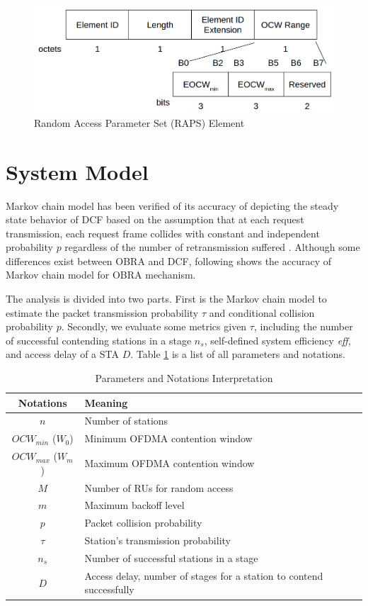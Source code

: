 \documentclass[journal]{IEEEtran}
\begin{document}
\begin{figure}[!t]
\includegraphics[scale=0.24]{./figure/Section_preliminary/fig_RAPS.png}
\caption{Random Access Parameter Set (RAPS) Element}
\label{fig_RAPS}
\end{figure}



\section{System Model} 		\label{sec_sys_model}
Markov chain model has been verified of its accuracy of depicting the steady state behavior of DCF based on the assumption that at each request transmission, each request frame collides with constant and independent probability $p$ regardless of the number of retransmission suffered \cite{bianchi2000performance}. 
Although some differences exist between OBRA and DCF, following shows the accuracy of Markov chain model for OBRA mechanism.

The analysis is divided into two parts. First is the Markov chain model to estimate the packet transmission probability $\tau$ and conditional collision probability $p$. 
Secondly, we evaluate some metrics given $\tau$, including the number of successful contending stations in a stage $n_s$, self-defined system efficiency \textit{eff}, and access delay of a STA $D$.  
Table \ref{table_notation} is a list of all parameters and notations.


\begin{table}[!h]
\caption{Parameters and Notations Interpretation}
\centering
\label{table_notation}
\begin{tabular}{c|m{4.5cm}}
\hline
Notations				& Meaning \\
\hline
$n$						& Number of stations \\
$OCW_{min}$ ($W_0$)		& Minimum OFDMA contention window \\
$OCW_{max}$ ($W_m$)		& Maximum OFDMA contention window \\
$M$						& Number of RUs for random access \\
$m$						& Maximum backoff level \\
$p$						& Packet collision probability \\
$\tau$					& Station's transmission probability \\
$n_s$					& Number of successful stations in a stage \\
$D$						& Access delay, number of stages for a station to contend successfully \\
\hline
\end{tabular}
\end{table}
\end{document}
